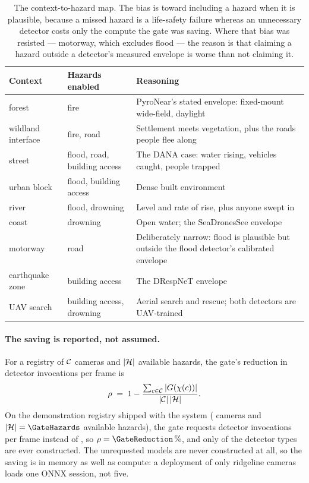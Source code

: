 \begin{table}[htbp]
\centering\small
\caption{The context-to-hazard map. The bias is toward including a hazard when
it is plausible, because a missed hazard is a life-safety failure whereas an
unnecessary detector costs only the compute the gate was saving. Where that
bias was resisted — motorway, which excludes flood — the reason is that
claiming a hazard outside a detector's measured envelope is worse than not
claiming it.}
\label{tab:gate}
\begin{tabularx}{\textwidth}{l l L}
\toprule
Context & Hazards enabled & Reasoning \\
\midrule
forest             & fire                              & PyroNear's stated envelope: fixed-mount wide-field, daylight \\
wildland interface & fire, road                        & Settlement meets vegetation, plus the roads people flee along \\
street             & flood, road, building access      & The DANA case: water rising, vehicles caught, people trapped \\
urban block        & flood, building access            & Dense built environment \\
river              & flood, drowning                   & Level and rate of rise, plus anyone swept in \\
coast              & drowning                          & Open water; the SeaDronesSee envelope \\
motorway           & road                              & Deliberately narrow: flood is plausible but outside the flood detector's calibrated envelope \\
earthquake zone    & building access                   & The DRespNeT envelope \\
UAV search         & building access, drowning         & Aerial search and rescue; both detectors are UAV-trained \\
\bottomrule
\end{tabularx}
\end{table}

\paragraph{The saving is reported, not assumed.}
For a registry of $\mathcal{C}$ cameras and $|\mathcal{H}|$ available hazards, the
gate's reduction in detector invocations per frame is
\begin{equation}
  \rho \;=\; 1 - \frac{\sum_{c \in \mathcal{C}} |G(\chi(c))|}
                      {|\mathcal{C}|\,|\mathcal{H}|}.
  \label{eq:gate-saving}
\end{equation}
On the demonstration registry shipped with the system (\GateCameras{}
cameras and $|\hazards| = \GateHazards$ available hazards), the gate requests
\GateGated{} detector invocations per frame instead of \GateUngated{}, so
$\rho = \GateReduction\,\%$, and only \GateModelsLoaded{} of the
\GateHazards{} detector types are ever constructed. The unrequested models are
never constructed at all, so the saving is in memory as well as compute: a
deployment of only ridgeline cameras loads one ONNX session, not five.

